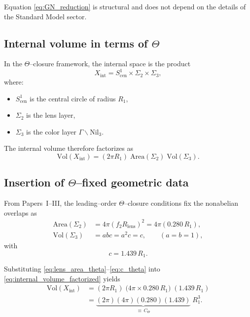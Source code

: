 \documentclass[11pt]{article}
\begin{document}
Equation \eqref{eq:GN_reduction} is structural and does not depend on the details
of the Standard Model sector.

\subsection{Internal volume in terms of $\Theta$}

In the $\Theta$--closure framework, the internal space is the product
\begin{equation}
X_{\mathrm{int}}
=
S^1_{\mathrm{cen}} \times \Sigma_2 \times \Sigma_3,
\end{equation}
where:
\begin{itemize}
\item $S^1_{\mathrm{cen}}$ is the central circle of radius $R_1$,
\item $\Sigma_2$ is the lens layer,
\item $\Sigma_3$ is the color layer $\Gamma\backslash\mathrm{Nil}_3$.
\end{itemize}

The internal volume therefore factorizes as
\begin{equation}
\mathrm{Vol}(X_{\mathrm{int}})
=
(2\pi R_1)\;
\mathrm{Area}(\Sigma_2)\;
\mathrm{Vol}(\Sigma_3).
\label{eq:internal_volume_factorized}
\end{equation}

\subsection{Insertion of $\Theta$--fixed geometric data}

From Papers~I--III, the leading--order $\Theta$--closure conditions fix the
nonabelian overlaps as
\begin{align}
\mathrm{Area}(\Sigma_2)
&=
4\pi (f_2 R_{\mathrm{lens}})^2
=
4\pi (0.280\,R_1),
\label{eq:lens_area_theta}\\
\mathrm{Vol}(\Sigma_3)
&=
abc
=
a^2 c
=
c,
\qquad (a=b=1),
\label{eq:nil_volume_theta}
\end{align}
with
\begin{equation}
c = 1.439\,R_1.
\label{eq:c_theta}
\end{equation}

Substituting \eqref{eq:lens_area_theta}--\eqref{eq:c_theta} into
\eqref{eq:internal_volume_factorized} yields
\begin{align}
\mathrm{Vol}(X_{\mathrm{int}})
&=
(2\pi R_1)\;
\big(4\pi \times 0.280\,R_1\big)\;
(1.439\,R_1)
\nonumber\\
&=
\underbrace{(2\pi)(4\pi)(0.280)(1.439)}_{\equiv\,C_{\Theta}}
\; R_1^3.
\label{eq:volume_theta_final}
\end{align}
\end{document}

